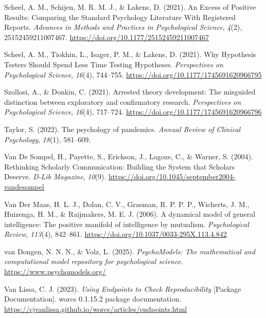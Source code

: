 \documentclass[
  man, noextraspace,floatsintext]{apa7}
\newlength{\cslhangindent}
\newenvironment{CSLReferences}[2] %
 {\begin{list}{}{%
  \setlength{\itemindent}{0pt}
  \setlength{\leftmargin}{0pt}
  \setlength{\parsep}{0pt}
  \ifodd #1
   \setlength{\leftmargin}{\cslhangindent}
   \setlength{\itemindent}{-1\cslhangindent}
  \fi
  \setlength{\itemsep}{#2\baselineskip}}}
 {\end{list}}
\begin{document}
\begin{CSLReferences}{1}{0}
Scheel, A. M., Schijen, M. R. M. J., \& Lakens, D. (2021). An {Excess} of {Positive Results}: {Comparing} the {Standard Psychology Literature With Registered Reports}. \emph{Advances in Methods and Practices in Psychological Science}, \emph{4}(2), 25152459211007467. \url{https://doi.org/10.1177/25152459211007467}

Scheel, A. M., Tiokhin, L., Isager, P. M., \& Lakens, D. (2021). Why {Hypothesis Testers Should Spend Less Time Testing Hypotheses}. \emph{Perspectives on Psychological Science}, \emph{16}(4), 744--755. \url{https://doi.org/10.1177/1745691620966795}

Szollosi, A., \& Donkin, C. (2021). Arrested theory development: {The} misguided distinction between exploratory and confirmatory research. \emph{Perspectives on Psychological Science}, \emph{16}(4), 717--724. \url{https://doi.org/10.1177/1745691620966796}

Taylor, S. (2022). The psychology of pandemics. \emph{Annual Review of Clinical Psychology}, \emph{18}(1), 581--609.

Van De Sompel, H., Payette, S., Erickson, J., Lagoze, C., \& Warner, S. (2004). Rethinking {Scholarly Communication}: {Building} the {System} that {Scholars Deserve}. \emph{D-Lib Magazine}, \emph{10}(9). \url{https://doi.org/10.1045/september2004-vandesompel}

Van Der Maas, H. L. J., Dolan, C. V., Grasman, R. P. P. P., Wicherts, J. M., Huizenga, H. M., \& Raijmakers, M. E. J. (2006). A dynamical model of general intelligence: {The} positive manifold of intelligence by mutualism. \emph{Psychological Review}, \emph{113}(4), 842--861. \url{https://doi.org/10.1037/0033-295X.113.4.842}

van Dongen, N. N. N., \& Volz, L. (2025). \emph{{PsychoModels}: {The} mathematical and computational model repository for psychological science.} \url{https://www.psychomodels.org/}

Van Lissa, C. J. (2023). \emph{Using {Endpoints} to {Check Reproducibility}} {[}Package Documentation{]}. worcs 0.1.15.2 package documentation. \url{https://cjvanlissa.github.io/worcs/articles/endpoints.html}


\end{CSLReferences}
\end{document}
